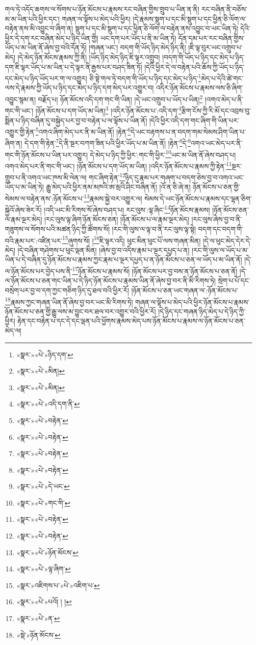གལ་ཏེ་འདོད་ཆགས་ལ་སོགས་པ་ཉོན་མོངས་པ་རྣམས་རང་བཞིན་གྱིས་གྲུབ་པ་ཡིན་ན་ནི། རང་བཞིན་ནི་བཅོས་མ་མ་ཡིན་པའི་ཕྱིར་དང་། གཞན་ལ་ལྟོས་པ་མེད་པའི་ཕྱིར། །དེ་རྣམས་སྡུག་པ་དང་མི་སྡུག་པ་དང་ཕྱིན་ཅི་ལོག་ལ་བརྟེན་ནས་མི་འབྱུང་བ་ཞིག་ན། སྡུག་པ་དང་མི་སྡུག་པ་དང་ཕྱིན་ཅི་ལོག་ལ་བརྟེན་ནས་འབྱུང་བ་ཡང་ཡིན་ཏེ། དེའི་ཕྱིར་དེ་དག་རང་བཞིན་མེད་པ་ཉིད་ཡིན་གྱི། ཡང་དག་པར་ཡོད་པ་ནི་མ་ཡིན་ཏེ། དོན་དམ་པར་རང་བཞིན་གྱིས་ཡོད་པ་མ་ཡིན་ནོ་ཞེས་བྱ་བའི་དོན་ཏོ། །གཞན་ཡང་། བདག་གི་ཡོད་ཉིད་མེད་ཉིད་ནི། །ཇི་ལྟ་བུར་ཡང་འགྲུབ་པ་མེད། །དེ་མེད་ཉོན་མོངས་རྣམས་ཀྱི་ནི། །ཡོད་ཉིད་མེད་ཉིད་ཇི་ལྟར་འགྲུབ། །བདག་གི་ཡོད་པ་ཉིད་དང་མེད་པ་ཉིད་དག་ཇི་ལྟར་ཡོད་པ་མ་ཡིན་པ་དེ་ལྟར་ནི་རྒྱས་པར་བཤད་ཟིན་ཏོ། །དེའི་ཕྱིར་དེ་ལ་བརྟེན་པའི་ཆོས་ཀྱི་ཡོད་པ་ཉིད་དང་མེད་པ་ཉིད་ཡོད་པར་ག་ལ་འགྱུར། ཅི་སྟེ་གལ་ཏེ་བདག་གི་ཡོད་པ་ཉིད་དང་མེད་པ་ཉིད་\footnote{«སྣར་»«པེ་»ཉིད་དག་}མེད་པ་དེའི་ཚེ་གང་ལས་དེ་རྣམས་ཀྱི་ཡོད་པ་ཉིད་དང་མེད་པ་ཉིད་དག་མེད་པར་འགྱུར་བ། འདིར་ཉོན་མོངས་པ་རྣམས་ལས་ཅི་ཞིག་འབྱུང་སྙམ་ན། བརྗོད་པ། ཉོན་མོངས་འདི་དག་གང་གི་ཡིན། །དེ་ཡང་འགྲུབ་པ་ཡོད་པ་ཡིན།\footnote{«སྣར་»«པེ་»མིན།} །འགའ་མེད་པ་ནི་གང་གི་ཡང་། །ཉོན་མོངས་པ་དག་ཡོད་མ་ཡིན།\footnote{«སྣར་»«པེ་»མིན།} །འདིར་ཉོན་མོངས་པ་:འདི་དག་\footnote{«སྣར་»«པེ་»འདི་དག་ནི་}རྩིག་ངོས་ཀྱི་རི་མོ་དང་འབྲས་བུ་སྨིན་པ་ཉིད་བཞིན་དུ་བསྐྱེད་པར་བྱ་བ་བརྟེན་པ་ལ་ལྟོས་པ་ཡིན་ནོ། །དེའི་ཕྱིར་འདི་དག་གང་ཞིག་གི་ཡིན་པར་འགྱུར་གྱི་རྟེན་\footnote{«སྣར་»«པེ་»བརྟེན་}འགའ་ཞིག་མེད་པར་ནི་མ་ཡིན་ནོ། །རྟེན་\footnote{«སྣར་»«པེ་»བརྟེན་}དེ་ཡང་བརྟགས་པ་ན་བདག་གམ་སེམས་ཤིག་ཡིན་པ་ཞིག་ན། དེ་དག་གི་རྟེན་\footnote{«སྣར་»«པེ་»བརྟེན་}དེ་ནི་སྔར་བཀག་ཟིན་པའི་ཕྱིར་ཡོད་པ་མ་ཡིན་ནོ། །རྟེན་\footnote{«སྣར་»«པེ་»བརྟེན་}དེ་\footnote{«སྣར་»«པེ་»དེ་ཡང་}འགའ་ཡང་མེད་པར་ནི་གང་གི་ཉོན་མོངས་པ་ཡིན་པར་འགྱུར། དེ་མེད་པ་ཉིད་ཀྱི་ཕྱིར་:གང་གི་ཕྱིར་\footnote{«སྣར་»«པེ་»གང་གི་}ཡང་མ་ཡིན་ནོ་ཞེས་བཤད་པ། འགའ་མེད་པར་ནི་གང་གི་ཡང་། །ཉོན་མོངས་པ་དག་ཡོད་མ་ཡིན། །འདིར་ཉོན་མོངས་པ་རྣམས་ཀྱི་རྟེན་\footnote{«སྣར་»«པེ་»བརྟེན་}སྔར་གྲུབ་པ་ནི་འགའ་ཡང་ཁས་མི་ལེན་ལ། གང་ཞིག་རྟེན་\footnote{«སྣར་»«པེ་»བརྟེན་}ཉིད་དུ་རྣམ་པར་གཞག་པ་བདག་ཅེས་བྱ་བ་འགའ་ཡང་ཡོད་པ་མ་ཡིན་ཏེ། རྒྱུ་མེད་པའི་ཕྱིར་ནམ་མཁའི་ཨ་མྲའི་ཤིང་བཞིན་ནོ། །འོ་ན་ཅི་ཞེ་ན། ཉོན་མོངས་པ་ཅན་གྱི་སེམས་ལ་བརྟེན་ནས་:ཉོན་མོངས་པ་\footnote{«སྣར་»«པེ་»ཉོན་མོངས་}རྣམས་སྐྱེ་བར་འགྱུར་ལ། སེམས་དེ་ཡང་ཉོན་མོངས་པ་རྣམས་དང་ལྷན་ཅིག་སྐྱེའོ་ཞེས་ཟེར་རོ། །འདི་ཡང་མི་རིགས་སོ་ཞེས་བཤད་པ། རང་ལུས་:ལྟ་ཞིང་\footnote{«སྣར་»«པེ་»ལྟ་ཞིག་}ཉོན་མོངས་རྣམས། །ཉོན་མོངས་ཅན་ལ་རྣམ་ལྔར་མེད། །རང་ལུས་ལྟ་ཞིག་ཉོན་མོངས་ཅན། །ཉོན་མོངས་པ་ལ་རྣམ་ལྔར་མེད། །རང་ལུས་ཞེས་བྱ་བ་ནི་གཟུགས་ལ་སོགས་པའི་མཚན་ཉིད་ཀྱི་ཚོགས་སོ། །རང་གི་ལུས་ལ་ལྟ་བ་ནི་རང་ལུས་ལྟ་སྟེ། བདག་དང་བདག་གི་བའི་རྣམ་པར་:འཛིན་པར་\footnote{«སྣར་»འཇིགས་པ་«པེ་»འཇིག་པ་}ཞུགས་སོ། །\footnote{«སྣར་»«པེ་»པའོ། ། །}ཇི་ལྟར་འདི། ཕུང་མིན་ཕུང་པོ་ལས་གཞན་མིན། །དེ་ལ་ཕུང་མེད་དེར་དེ་མེད། །དེ་བཞིན་གཤེགས་པ་ཕུང་ལྡན་མིན། །ཞེས་བྱ་བ་འདིས་རྣམ་པ་ལྔར་དཔྱད་པ་ན། །རང་གི་ལུས་ལ་ཡོད་པ་མ་ཡིན་པ་དེ་བཞིན་དུ་ཉོན་མོངས་པ་རྣམས་ཀྱང་རྣམ་པ་ལྔར་དཔྱད་པ་ན་ཉོན་མོངས་པ་ཅན་ལ་ཡོད་པ་མ་ཡིན་ནོ། །དེ་ལ་ཉོན་མོངས་པར་བྱེད་པས་ནི་\footnote{«སྣར་»«པེ་»ན་}ཉོན་མོངས་པ་རྣམས་སོ། །ཉོན་མོངས་པར་བྱ་བས་ན་ཉོན་མོངས་པ་ཅན་ནོ། །དེ་ལ་ཉོན་མོངས་པ་ཅན་གང་ཡིན་པ་དེ་ཉིད་ཉོན་མོངས་པ་རྣམས་ཡིན་ནོ་ཞེས་བྱ་བར་ནི་མི་རིགས་ཏེ། སྲེག་པ་པོ་དང་བསྲེག་པར་བྱ་བ་དག་ཀྱང་གཅིག་ཉིད་དུ་ཐལ་བའི་ཕྱིར་རོ། །ཉོན་མོངས་པ་ཅན་ཡང་གཞན་ལ་:ཉོན་མོངས་པ་\footnote{«སྡེ་»ཉོན་མོངས་}རྣམས་ཀྱང་གཞན་ཡིན་ནོ་ཞེས་བྱ་བར་ཡང་མི་རིགས་ཏེ། གཞན་ལ་ལྟོས་པ་མེད་པའི་ཕྱིར་ཉོན་མོངས་པ་རྣམས་ཉོན་མོངས་པ་ཅན་གྱི་རྒྱུ་ལས་མ་བྱུང་བར་ཐལ་བར་འགྱུར་བའི་ཕྱིར་རོ། །དེ་ཉིད་དང་གཞན་ཉིད་མེད་པ་དེ་ཉིད་ཀྱི་ཕྱིར། རྟེན་དང་བརྟེན་པ་དང་དེ་དང་ལྡན་པའི་ཕྱོགས་རྣམས་མེད་པས་ཉོན་མོངས་པ་རྣམས་ལ་ཉོན་མོངས་པ་ཅན་མེད་ལ། 